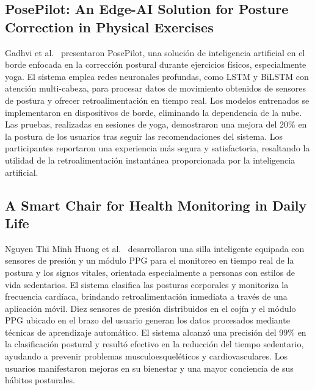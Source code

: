 \documentclass[manuscript,screen,review]{acmart}
\begin{document}
\subsection{PosePilot: An Edge-AI Solution for Posture Correction in Physical Exercises}
Gadhvi et al.\ \cite{gadhvi2025posepilot} presentaron PosePilot, una solución de inteligencia artificial en el borde enfocada en la corrección postural durante ejercicios físicos, especialmente yoga. El sistema emplea redes neuronales profundas, como LSTM y BiLSTM con atención multi-cabeza, para procesar datos de movimiento obtenidos de sensores de postura y ofrecer retroalimentación en tiempo real. Los modelos entrenados se implementaron en dispositivos de borde, eliminando la dependencia de la nube. Las pruebas, realizadas en sesiones de yoga, demostraron una mejora del 20\% en la postura de los usuarios tras seguir las recomendaciones del sistema. Los participantes reportaron una experiencia más segura y satisfactoria, resaltando la utilidad de la retroalimentación instantánea proporcionada por la inteligencia artificial.

\subsection{A Smart Chair for Health Monitoring in Daily Life}
Nguyen Thi Minh Huong et al.\ \cite{nguyen2024smart} desarrollaron una silla inteligente equipada con sensores de presión y un módulo PPG para el monitoreo en tiempo real de la postura y los signos vitales, orientada especialmente a personas con estilos de vida sedentarios. El sistema clasifica las posturas corporales y monitoriza la frecuencia cardíaca, brindando retroalimentación inmediata a través de una aplicación móvil. Diez sensores de presión distribuidos en el cojín y el módulo PPG ubicado en el brazo del usuario generan los datos procesados mediante técnicas de aprendizaje automático. El sistema alcanzó una precisión del 99\% en la clasificación postural y resultó efectivo en la reducción del tiempo sedentario, ayudando a prevenir problemas musculoesqueléticos y cardiovasculares. Los usuarios manifestaron mejoras en su bienestar y una mayor conciencia de sus hábitos posturales.
\end{document}
